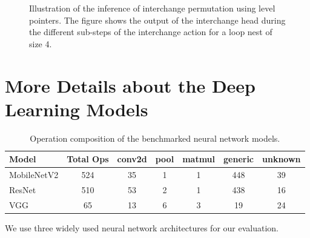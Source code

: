 \documentclass[10pt,twocolumn]{article}
\begin{document}
\begin{figure}[t]
\centering
{}
\caption{Illustration of the inference of interchange permutation using level pointers. The figure shows the output of the interchange head during the different sub-steps of the interchange action for a loop nest of size 4.}
\label{fig:levelpointers}
\end{figure}

\section{More Details about the Deep Learning Models}
\label{app:models}

\begin{table}[t]
\centering
\caption{Operation composition of the benchmarked neural network models.}
\label{tab:modelops}
\begin{tabular}{lcccccc}
\toprule
Model & Total Ops & conv2d & pool & matmul & generic & unknown \\
\midrule
MobileNetV2 & 524 & 35 & 1 & 1 & 448 & 39 \\
ResNet & 510 & 53 & 2 & 1 & 438 & 16 \\
VGG & 65 & 13 & 6 & 3 & 19 & 24 \\
\bottomrule
\end{tabular}
\end{table}

We use three widely used neural network architectures for our evaluation.
\end{document}
